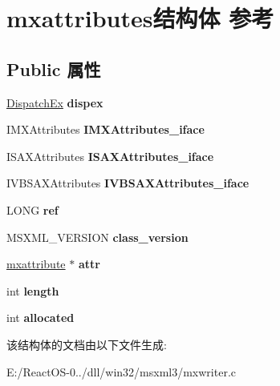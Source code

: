 \hypertarget{structmxattributes}{}\section{mxattributes结构体 参考}
\label{structmxattributes}
\subsection*{Public 属性}
\begin{DoxyCompactItemize}
\item 
\mbox{\label{structmxattributes_a8f322d0e93d430e6c7ba92953fe9b148}} 
\hyperlink{struct_dispatch_ex}{Dispatch\+Ex} {\bfseries dispex}
\item 
\mbox{\label{structmxattributes_a69c4661fff5709aec64cd0d2d15032f5}} 
I\+M\+X\+Attributes {\bfseries I\+M\+X\+Attributes\+\_\+iface}
\item 
\mbox{\label{structmxattributes_a5e36397c20d3f474dfdb1e544fb7a2bf}} 
I\+S\+A\+X\+Attributes {\bfseries I\+S\+A\+X\+Attributes\+\_\+iface}
\item 
\mbox{\label{structmxattributes_a82cc0ca27e904ac1361947446c999c9a}} 
I\+V\+B\+S\+A\+X\+Attributes {\bfseries I\+V\+B\+S\+A\+X\+Attributes\+\_\+iface}
\item 
\mbox{\label{structmxattributes_a67d65f99750203e62eac12922c24d51e}} 
L\+O\+NG {\bfseries ref}
\item 
\mbox{\label{structmxattributes_ade07603c8c88560372e4166e23cf945f}} 
M\+S\+X\+M\+L\+\_\+\+V\+E\+R\+S\+I\+ON {\bfseries class\+\_\+version}
\item 
\mbox{\label{structmxattributes_abdbdb5d15cd6e7932cf4f2152f87e713}} 
\hyperlink{structmxattribute}{mxattribute} $\ast$ {\bfseries attr}
\item 
\mbox{\label{structmxattributes_a6d74b72f56f5e5dbb2d8960230fbc6bb}} 
int {\bfseries length}
\item 
\mbox{\label{structmxattributes_ac5ca8c41d7c28dfc95330e7fb51a0616}} 
int {\bfseries allocated}
\end{DoxyCompactItemize}


该结构体的文档由以下文件生成\+:\begin{DoxyCompactItemize}
\item 
E\+:/\+React\+O\+S-\/0../dll/win32/msxml3/mxwriter.\+c\end{DoxyCompactItemize}
